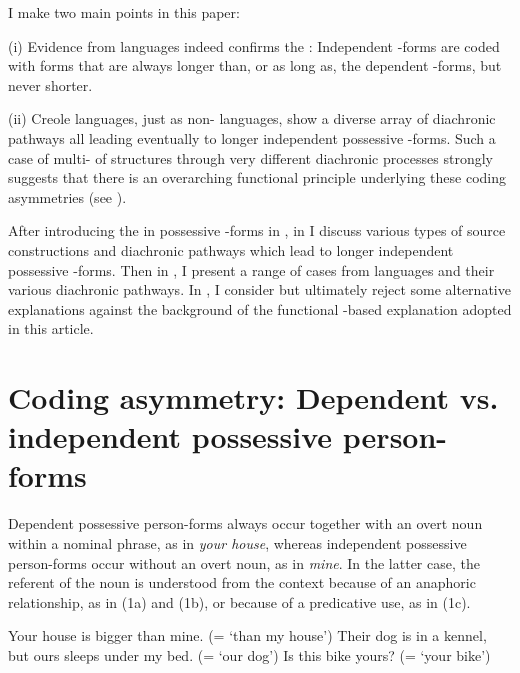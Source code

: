 \documentclass[output=paper]{langsci/langscibook}
\begin{document}
I make two main points in this paper:

(i) Evidence from  languages indeed confirms the : Independent -forms are coded with forms that are always longer than, or as long as, the dependent -forms, but never shorter.

(ii) Creole languages, just as non- languages, show a diverse array of diachronic pathways all leading eventually to longer independent possessive -forms. Such a case of multi- of structures through very different diachronic processes strongly suggests that there is an overarching functional  principle underlying these coding asymmetries (see ). 

After introducing the  in possessive -forms in , in  I discuss various types of source constructions and diachronic pathways which lead to longer independent possessive -forms. Then in , I present a range of cases from  languages and their various diachronic pathways. In , I consider but ultimately reject some alternative explanations against the background of the functional -based explanation adopted in this article. 

\section{Coding asymmetry: Dependent vs. independent possessive {person}-forms}\label{sec:michaelis:2} 

Dependent possessive per\-son-forms always occur together with an overt noun within a nominal phrase, as in \textit{your house}, whereas independent possessive {per\-son}-forms occur without an overt noun, as in \textit{mine}. In the latter case, the referent of the noun is understood from the context because of an anaphoric relationship, as in (1a) and (1b), or because of a predicative use, as in (1c).  

\ea
{}
\ea
Your house is bigger than mine. (= ‘than my house’)
\ex
 Their dog is in a kennel, but ours sleeps under my bed. (= ‘our dog’)
\ex 
 Is this bike yours? (= ‘your bike’)
\z
\z
\end{document}
